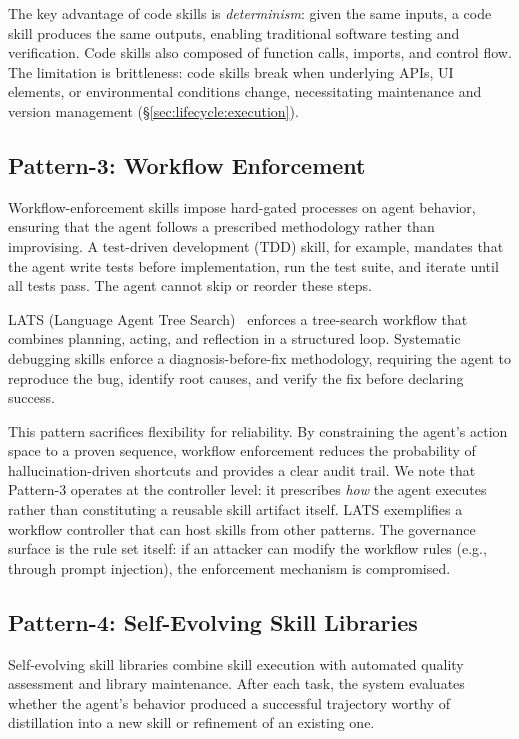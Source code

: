 \documentclass[conference, compsoc]{IEEEtran}
\theoremstyle{plain}
\begin{document}
The key advantage of code skills is \emph{determinism}: given the same inputs, a code skill produces the same outputs, enabling traditional software testing and verification. Code skills also composed of function calls, imports, and control flow. The limitation is brittleness: code skills break when underlying APIs, UI elements, or environmental conditions change, necessitating maintenance and version management (\S\ref{sec:lifecycle:execution}).

\subsection{Pattern-3: Workflow Enforcement}
\label{sec:patterns:workflow}

Workflow-enforcement skills impose hard-gated processes on agent behavior, ensuring that the agent follows a prescribed methodology rather than improvising. A test-driven development (TDD) skill, for example, mandates that the agent write tests before implementation, run the test suite, and iterate until all tests pass. The agent cannot skip or reorder these steps.

LATS (Language Agent Tree Search)~\cite{zhou2023lats} enforces a tree-search workflow that combines planning, acting, and reflection in a structured loop. Systematic debugging skills enforce a diagnosis-before-fix methodology, requiring the agent to reproduce the bug, identify root causes, and verify the fix before declaring success.

This pattern sacrifices flexibility for reliability. By constraining the agent's action space to a proven sequence, workflow enforcement reduces the probability of hallucination-driven shortcuts and provides a clear audit trail. We note that Pattern-3 operates at the controller level: it prescribes \emph{how} the agent executes rather than constituting a reusable skill artifact itself. LATS exemplifies a workflow controller that can host skills from other patterns. The governance surface is the rule set itself: if an attacker can modify the workflow rules (e.g., through prompt injection), the enforcement mechanism is compromised.

\subsection{Pattern-4: Self-Evolving Skill Libraries}
\label{sec:patterns:selfevolving}

Self-evolving skill libraries combine skill execution with automated quality assessment and library maintenance. After each task, the system evaluates whether the agent's behavior produced a successful trajectory worthy of distillation into a new skill or refinement of an existing one.
\end{document}
